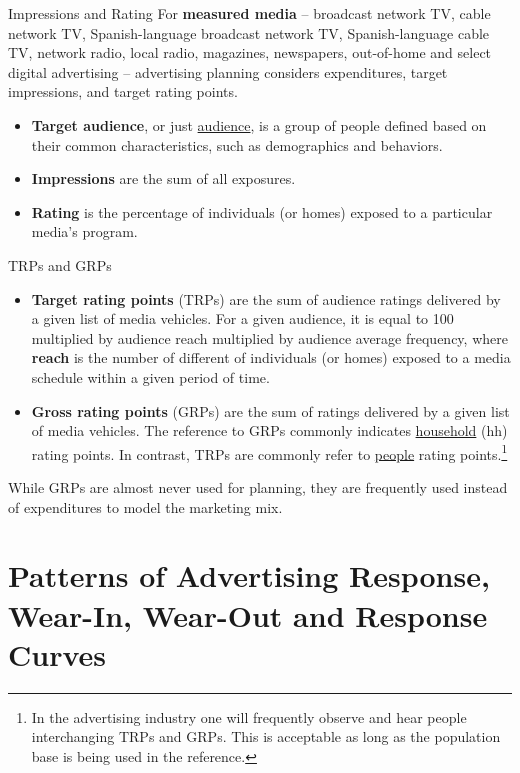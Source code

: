 \documentclass[pdf]{beamer}
\newcommand{\empr}[1]{{\color{franklinblue}\textbf{#1}}}
\theoremstyle{remark}
\theoremstyle{definition}
\begin{document}
\begin{frame}[t]{Impressions and Rating}
For \empr{measured media} -- broadcast network TV, cable network TV,  Spanish-language broadcast network TV, Spanish-language cable TV, network radio, local radio, magazines, newspapers, out-of-home and select digital advertising -- advertising planning considers expenditures, target impressions, and target rating points.\\
\vspace{1.5ex}
\begin{itemize}
  \item \empr{Target audience}, or just \underline{audience}, is a group of people defined based on their common characteristics, such as demographics and behaviors.
  \item \empr{Impressions} are the sum of all exposures.
  \item \empr{Rating} is the percentage of individuals (or homes) exposed to a particular media's program.
\end{itemize}
\end{frame}

\begin{frame}[t]{TRPs and GRPs}
\begin{itemize}
  \item \empr{Target rating points} (TRPs) are the sum of audience ratings delivered by a given list of media vehicles.  For a given audience, it is equal to 100 multiplied by audience reach multiplied by audience average frequency, where \empr{reach} is the number of different of individuals (or homes) exposed to a media schedule within a given period of time.
  \item \empr{Gross rating points} (GRPs) are the sum of ratings delivered by a given list of media vehicles.  The reference to GRPs commonly indicates \underline{household} (hh) rating points.  In contrast, TRPs are commonly refer to \underline{people} rating points.\footnote{In the advertising industry one will frequently observe and hear people interchanging TRPs and GRPs.  This is acceptable as long as the population base is being used in the reference.}  
\end{itemize}
  While GRPs are almost never used for planning, they are frequently used instead of expenditures to model the marketing mix. 
\end{frame}

\section{Patterns of Advertising Response, Wear-In, Wear-Out and Response Curves}
\end{document}

